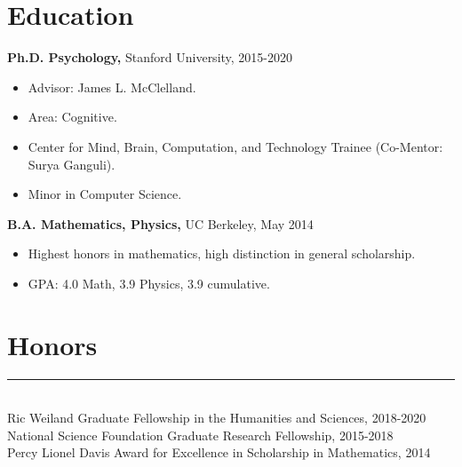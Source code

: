 \documentclass[margin]{res}
\begin{document}
 
 
 
\address{{\bf Address} \\ Department of Psychology \\ Stanford University \\ 450 Serra Mall \\ Stanford, CA 94305}
\address{{\bf Contact Information} \\ lampinen@stanford.edu \\\url{https://lampinen.github.io}}
\begin{resume} 
\section{Education} 
{\bf Ph.D. Psychology,} Stanford University, 2015-2020
\begin{itemize} \itemsep -2pt \item Advisor: James L. McClelland. \item Area: Cognitive. \item Center for Mind, Brain, Computation, and Technology Trainee (Co-Mentor: Surya Ganguli). \item Minor in Computer Science.\end{itemize}
{\bf B.A. Mathematics, Physics,} UC Berkeley, May 2014 \begin{itemize} \itemsep -2pt \item Highest honors in mathematics, high distinction in general scholarship. \item GPA: 4.0 Math, 3.9 Physics, 3.9 cumulative. %
\end{itemize}
\vspace{1pt}\section{Honors} \vspace{-15pt} \rule{\textwidth}{0.5pt} \\[3pt]
Ric Weiland Graduate Fellowship in the Humanities and Sciences, 2018-2020 \\
National Science Foundation Graduate Research Fellowship, 2015-2018 \\
Percy Lionel Davis Award for Excellence in Scholarship in Mathematics, 2014 \\ 

\end{resume}
\end{document}
